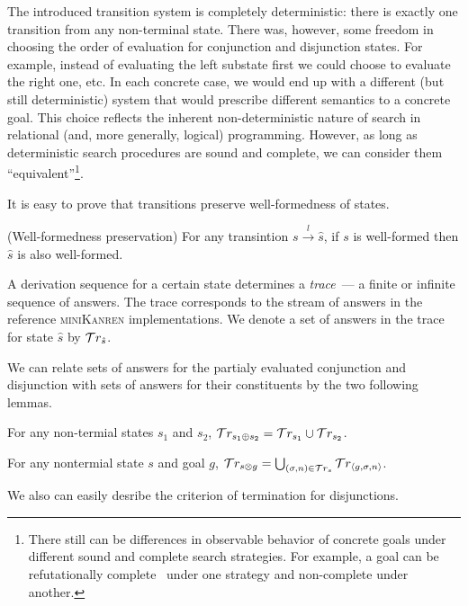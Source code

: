 The introduced transition system is completely deterministic: there is exactly one transition from any non-terminal state.
There was, however, some freedom in choosing the order of evaluation for conjunction and
disjunction states. For example, instead of evaluating the left substate first we could choose to evaluate the right one, etc. In each concrete case, we would
end up with a different (but still deterministic) system that would prescribe different semantics to a concrete goal. This choice reflects the inherent
non-deterministic nature of search in relational (and, more generally, logical) programming. However, as long as deterministic search procedures
are sound and complete, we can consider them ``equivalent''\footnote{There still can be differences in observable behavior of concrete goals under different
sound and complete search strategies. For example, a goal can be refutationally complete~\cite{WillThesis} under one strategy and non-complete under another.}.

It is easy to prove that transitions preserve well-formedness of states.

\begin{lemma}{(Well-formedness preservation)}
\label{lem:well_formedness_preservation}
For any transintion $s \xrightarrow{l} \hat{s}$, if $s$ is well-formed then $\hat{s}$ is also well-formed.
\end{lemma}

A derivation sequence for a certain state determines a \emph{trace}~--- a finite or infinite sequence of answers. The trace corresponds to the stream of answers
in the reference \textsc{miniKanren} implementations. We denote a set of answers in the trace for state $\hat{s}$ by $\mathcal{T}r_{\hat{s}}$.

We can relate sets of answers for the partialy evaluated conjunction and disjunction with sets of answers for their constituents by the two following lemmas.

\begin{lemma}
\label{lem:sum_answers}
For any non-termial states $s_1$ and $s_2$, $\mathcal{T}r_{s_1 \oplus s_2} = \mathcal{T}r_{s_1} \cup \mathcal{T}r_{s_2}$.
\end{lemma}

\begin{lemma}
\label{lem:prod_answers}
For any nontermial state $s$ and goal $g$,  $\mathcal{T}r_{s \otimes g} = \bigcup_{(\sigma, n) \in \mathcal{T}r_{s}} \mathcal{T}r_{\left<{g, \sigma, n}\right>}$.
\end{lemma}

We also can easily desribe the criterion of termination for disjunctions.

